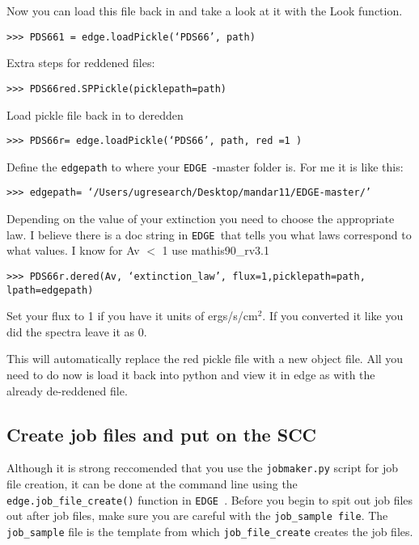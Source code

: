 \documentclass{article}
\newcommand{\edge}{\texttt{EDGE }}
\begin{document}
Now you can load this file back in and take a look at it with the Look function.

\vspace{2mm}
\texttt{>>> PDS661 = edge.loadPickle(‘PDS66’, path)}
\vspace{2mm}

Extra steps for reddened files:

\vspace{2mm}
\texttt{>>> PDS66red.SPPickle(picklepath=path)}
\vspace{2mm}

Load pickle file back in to deredden

\vspace{2mm}
\texttt{>>> PDS66r= edge.loadPickle(‘PDS66’, path, red =1 )}
\vspace{2mm}
	
Define the \texttt{edgepath} to where your \edge-master folder is. For me it is like this:

\vspace{2mm}
\texttt{>>> edgepath= ‘/Users/ugresearch/Desktop/mandar11/EDGE-master/’}
\vspace{2mm}	
	 
Depending on the value of your extinction you need to choose the appropriate law. I believe there is a doc string in \edge that tells you what laws correspond to what values. I know for Av $<$ 1 use mathis90\_rv3.1

\vspace{2mm}
\texttt{>>> PDS66r.dered(Av, ‘extinction\_law’, flux=1,picklepath=path, }\\
\texttt{lpath=edgepath) }
\vspace{2mm}

Set your flux to 1 if you have it units of ergs/s/cm$^2$. If you converted it like you did the spectra leave it as 0.

This will automatically replace the red pickle file with a new object file. All you need to do now is load it back into python and view it in edge as with the already de-reddened file. 

\subsection{Create job files and put on the SCC}

Although it is strong reccomended that you use the \texttt{jobmaker.py} script for job file creation, it can be done at the command line using the \texttt{edge.job\_file\_create()} function in \edge. Before you begin to spit out job files out after job files, make sure you are careful with the \texttt{job\_sample file}. The \texttt{job\_sample} file is the template from which \texttt{job\_file\_create} creates the job files. 
\end{document}
